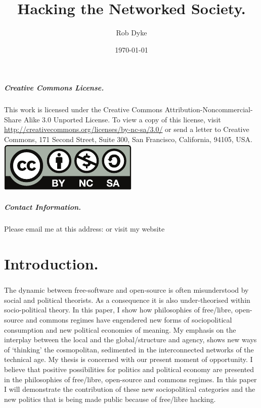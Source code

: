 \documentclass[11pt,titlepage]{book}
\title{Hacking the Networked Society.}
\author{Rob Dyke}
\date{\today}
\begin{document}

\sloppy
\maketitle
\newpage
{}
\paragraph{Creative Commons License.}\newline This work is licensed under the Creative Commons Attribution-Noncommercial-Share Alike 3.0 Unported License. To view a copy of this license, visit \url{http://creativecommons.org/licenses/by-nc-sa/3.0/} or send a letter to Creative Commons, 171 Second Street, Suite 300, San Francisco, California, 94105, USA.
\newline\newline
\includegraphics{by-nc-sa.pdf}
\newline\newline
\paragraph{Contact Information.}Please email me at this address:  or visit my website 
\tableofcontents
\newpage
\doublespacing
\chapter{Introduction.}
\paragraph{}The dynamic between free-software and open-source is often misunderstood by social and political theorists. As a consequence it is also under-theorised within socio-political theory. In this paper, I show how philosophies of free/libre, open-source and commons regimes have engendered new forms of sociopolitical consumption and new political economies of meaning. My emphasis on the interplay between the local and the global/structure and agency, shows new ways of `thinking' the cosmopolitan, sedimented in the interconnected networks of the technical age. My thesis is concerned with our present moment of opportunity. I believe that positive possibilities for politics and political economy are presented in the philosophies of free/libre, open-source and commons regimes. In this paper I will demonstrate the contribution of these new sociopolitical categories and the new politics that is being made public because of free/libre hacking.
\end{document}
